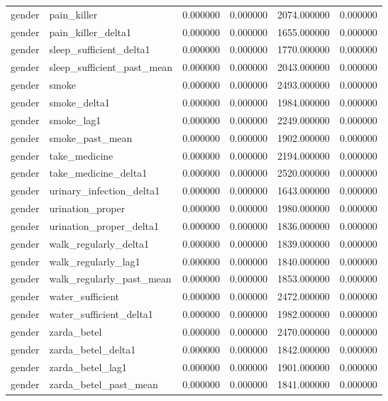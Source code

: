 \begin{longtable}{llrrrr}
gender & pain\_killer & 0.000000 & 0.000000 & 2074.000000 & 0.000000 \\
gender & pain\_killer\_delta1 & 0.000000 & 0.000000 & 1655.000000 & 0.000000 \\
gender & sleep\_sufficient\_delta1 & 0.000000 & 0.000000 & 1770.000000 & 0.000000 \\
gender & sleep\_sufficient\_past\_mean & 0.000000 & 0.000000 & 2043.000000 & 0.000000 \\
gender & smoke & 0.000000 & 0.000000 & 2493.000000 & 0.000000 \\
gender & smoke\_delta1 & 0.000000 & 0.000000 & 1984.000000 & 0.000000 \\
gender & smoke\_lag1 & 0.000000 & 0.000000 & 2249.000000 & 0.000000 \\
gender & smoke\_past\_mean & 0.000000 & 0.000000 & 1902.000000 & 0.000000 \\
gender & take\_medicine & 0.000000 & 0.000000 & 2194.000000 & 0.000000 \\
gender & take\_medicine\_delta1 & 0.000000 & 0.000000 & 2520.000000 & 0.000000 \\
gender & urinary\_infection\_delta1 & 0.000000 & 0.000000 & 1643.000000 & 0.000000 \\
gender & urination\_proper & 0.000000 & 0.000000 & 1980.000000 & 0.000000 \\
gender & urination\_proper\_delta1 & 0.000000 & 0.000000 & 1836.000000 & 0.000000 \\
gender & walk\_regularly\_delta1 & 0.000000 & 0.000000 & 1839.000000 & 0.000000 \\
gender & walk\_regularly\_lag1 & 0.000000 & 0.000000 & 1840.000000 & 0.000000 \\
gender & walk\_regularly\_past\_mean & 0.000000 & 0.000000 & 1853.000000 & 0.000000 \\
gender & water\_sufficient & 0.000000 & 0.000000 & 2472.000000 & 0.000000 \\
gender & water\_sufficient\_delta1 & 0.000000 & 0.000000 & 1982.000000 & 0.000000 \\
gender & zarda\_betel & 0.000000 & 0.000000 & 2470.000000 & 0.000000 \\
gender & zarda\_betel\_delta1 & 0.000000 & 0.000000 & 1842.000000 & 0.000000 \\
gender & zarda\_betel\_lag1 & 0.000000 & 0.000000 & 1901.000000 & 0.000000 \\
gender & zarda\_betel\_past\_mean & 0.000000 & 0.000000 & 1841.000000 & 0.000000 \\

\end{longtable}
